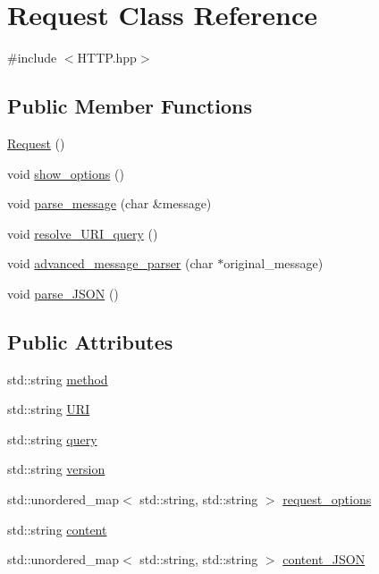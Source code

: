 \hypertarget{class_request}{}\section{Request Class Reference}
\label{class_request}


{\ttfamily \#include $<$H\+T\+T\+P.\+hpp$>$}

\subsection*{Public Member Functions}
\begin{DoxyCompactItemize}
\item 
\hyperlink{class_request_afaf8d8928de7ffff8a3767589489bd33}{Request} ()
\item 
void \hyperlink{class_request_ad4a0a5e5d89b7f1289e98e0c29b5239c}{show\+\_\+options} ()
\item 
void \hyperlink{class_request_a7de5ef92f56abd5ed7aa2b78f5dddadb}{parse\+\_\+message} (char \&message)
\item 
void \hyperlink{class_request_a8b5ac840837aec546287976a11dc4b1a}{resolve\+\_\+\+U\+R\+I\+\_\+query} ()
\item 
void \hyperlink{class_request_a6633a3bac0300e17f356302d6b658ef2}{advanced\+\_\+message\+\_\+parser} (char $\ast$original\+\_\+message)
\item 
void \hyperlink{class_request_adc13ade88a8d868013fbc79d7ab645d4}{parse\+\_\+\+J\+S\+ON} ()
\end{DoxyCompactItemize}
\subsection*{Public Attributes}
\begin{DoxyCompactItemize}
\item 
std\+::string \hyperlink{class_request_ae81f481b58e82cad7808543f88290903}{method}
\item 
std\+::string \hyperlink{class_request_abe4fe525c1b9a1526c848e064c25f88b}{U\+RI}
\item 
std\+::string \hyperlink{class_request_ab594227b55eb0af1a4f80d310a088d50}{query}
\item 
std\+::string \hyperlink{class_request_a736c2c715b9392706662727a4a353172}{version}
\item 
std\+::unordered\+\_\+map$<$ std\+::string, std\+::string $>$ \hyperlink{class_request_a77959ef59eada5eed1db6425ed316f8c}{request\+\_\+options}
\item 
std\+::string \hyperlink{class_request_a63759662b44d0dbd16ae45a32aca1afd}{content}
\item 
std\+::unordered\+\_\+map$<$ std\+::string, std\+::string $>$ \hyperlink{class_request_a3fbffd427990b4665f86d9c41676dad9}{content\+\_\+\+J\+S\+ON}
\end{DoxyCompactItemize}


